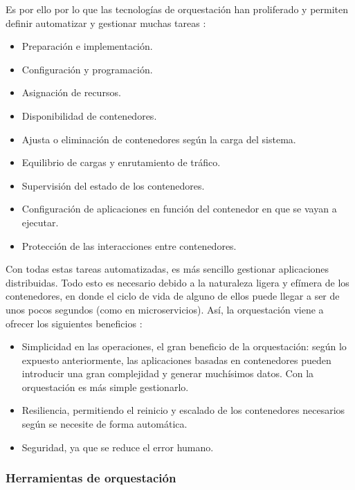 Es por ello por lo que las tecnologías de orquestación han proliferado y
permiten definir automatizar y gestionar muchas tareas \cite{QueEsOrganizacion}:

\begin{itemize}
    \item Preparación e implementación.
    \item Configuración y programación.
    \item Asignación de recursos.
    \item Disponibilidad de contenedores.
    \item Ajusta o eliminación de contenedores según la carga del sistema.
    \item Equilibrio de cargas y enrutamiento de tráfico.
    \item Supervisión del estado de los contenedores.
    \item Configuración de aplicaciones en función del contenedor en que se
          vayan a ejecutar.
    \item Protección de las interacciones entre contenedores.
\end{itemize}

Con todas estas tareas automatizadas, es más sencillo gestionar aplicaciones
distribuidas. Todo esto es necesario debido a la naturaleza ligera y efímera
de los contenedores, en donde el ciclo de vida de alguno de ellos puede llegar
a ser de unos pocos segundos (como en microservicios). Así, la orquestación viene
a ofrecer los siguientes beneficios \autocite{ContainerOrchestration}:

\begin{itemize}
    \item Simplicidad en las operaciones, el gran beneficio de la orquestación:
          según lo expuesto anteriormente, las aplicaciones basadas en contenedores
          pueden introducir una gran complejidad y generar muchísimos datos. Con
          la orquestación es más simple gestionarlo.
    \item Resiliencia, permitiendo el reinicio y escalado de los contenedores 
          necesarios según se necesite de forma automática.
    \item Seguridad, ya que se reduce el error humano.
\end{itemize}

\subsubsection{Herramientas de orquestación}
